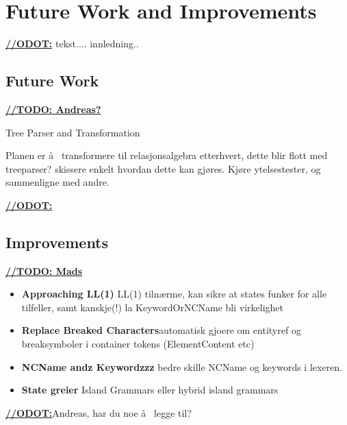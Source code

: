 \chapter{Future Work and Improvements}
\label{sect:summary:future_work}
\underline{\textbf{\LARGE //ODOT:}} tekst.... innledning..


\section{Future Work}
\underline{\textbf{\LARGE //TODO: Andreas?}}

Tree Parser and Transformation

Planen er \aa~ transformere til relasjonsalgebra etterhvert, dette blir flott med treeparser? skissere enkelt hvordan dette kan gj\o res. Kj\o re ytelsestester, og sammenligne med andre.

\underline{\textbf{\LARGE //ODOT:}}

\section{Improvements}
\label{sect:future:improvements}
\underline{\textbf{\LARGE //TODO: Mads}} 

\begin{itemize}
\item \textbf{Approaching LL(1)} LL(1) tiln\ae rme, kan sikre at states funker for alle tilfeller, samt kanskje(!) la KeywordOrNCName bli virkelighet


\item \textbf{Replace Breaked Characters}automatisk gjoere om entityref og breaksymboler i container tokens (ElementContent etc)

\item \textbf{NCName andz Keywordzzz} bedre skille NCName og keywords i lexeren.

\item \textbf{State greier} Island Grammars eller hybrid island grammars

\end{itemize}

\underline{\textbf{\LARGE //ODOT:}}Andreas, har du noe \aa~ legge til?





